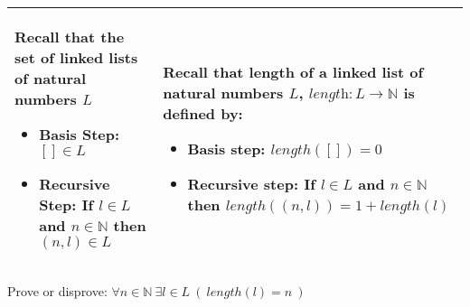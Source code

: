 \documentclass[12pt, oneside]{article}
\begin{document}
\begin{center}
\begin{tabular}{|p{3.5in}|p{3.5in}|}
\hline
Recall that the set of linked lists of natural numbers $L$

\vspace{-10pt}

\begin{itemize}
\item[] Basis Step: $[] \in L$

\vspace{-10pt}

\item[] Recursive Step: If $l \in L$ and $n \in \mathbb{N}$ then $(n, l) \in L$
\end{itemize}

\vspace{-20pt}

&
Recall that length of a linked list of natural numbers $L$, $\textit{length}: L \to \mathbb{N}$ is defined by:

\vspace{-10pt}

\begin{itemize}
\item[] Basis step: $length([]) = 0 $

\vspace{-10pt}

\item[] Recursive step: If $l \in L$ and $n \in \mathbb{N}$ then $length((n, l)) = 1+ length(l)$
\end{itemize}

\vspace{-20pt}

\\
\hline
\end{tabular}
\end{center}

\vspace{-10pt}

Prove or disprove: $\forall n \in \mathbb{N} ~\exists l \in L ~(~length(l) = n~)$


\vfill
\vfill
\vfill

\newpage
\end{document}
